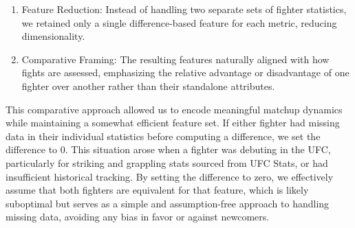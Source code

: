 \documentclass[12pt,twoside]{report}
\begin{document}
\begin{enumerate}
    \item Feature Reduction: Instead of handling two separate sets of fighter statistics, we retained only a single difference-based feature for each metric, reducing dimensionality.

    \item Comparative Framing: The resulting features naturally aligned with how fights are assessed, emphasizing the relative advantage or disadvantage of one fighter over another rather than their standalone attributes.
\end{enumerate}
This comparative approach allowed us to encode meaningful matchup dynamics while maintaining a somewhat efficient feature set. If either fighter had missing data in their individual statistics before computing a difference, we set the difference to 0. This situation arose when a fighter was debuting in the UFC, particularly for striking and grappling stats sourced from UFC Stats, or had insufficient historical tracking. By setting the difference to zero, we effectively assume that both fighters are equivalent for that feature, which is likely suboptimal but serves as a simple and assumption-free approach to handling missing data, avoiding any bias in favor or against newcomers.
\end{document}

